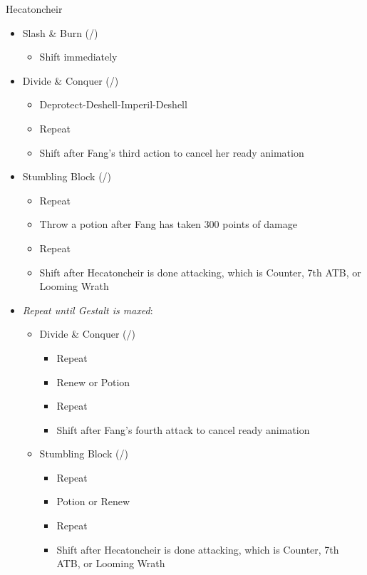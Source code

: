 \renewcommand{\first}{[1] Slash \& Burn (\rav/\com)}
\renewcommand{\second}{[2] Lifeguard (\med/\sen)}
\renewcommand{\third}{[3] Divide \& Conquer (\sab/\com)}
\renewcommand{\fourth}{[4] Stumbling Block (\sab/\sen)}
\begin{battle}{Hecatoncheir}
\begin{multicols}{2}
\begin{itemize}
    \item \first
    \begin{itemize}
        \item Shift immediately
    \end{itemize}
    \item \third
    \begin{itemize}
        \item Deprotect-Deshell-Imperil-Deshell
        \item Repeat
        \item Shift after Fang's third action to cancel her ready animation
    \end{itemize}
    \item \fourth
    \begin{itemize}
        \item Repeat
        \item Throw a potion after Fang has taken 300 points of damage
        \item Repeat
        \item Shift after Hecatoncheir is done attacking, which is Counter, 7th ATB, or Looming Wrath
    \end{itemize}
    \columnbreak
    \item \textit{Repeat until Gestalt is maxed}:
    \begin{itemize}
        \item \third
        \begin{itemize}
            \item Repeat
            \item Renew or Potion
            \item Repeat
            \item Shift after Fang's fourth attack to cancel ready animation
        \end{itemize}
        \item \fourth
        \begin{itemize}
            \item Repeat
            \item Potion or Renew
            \item Repeat
            \item Shift after Hecatoncheir is done attacking, which is Counter, 7th ATB, or Looming Wrath
        \end{itemize}
    \end{itemize}
\end{itemize}
\end{multicols}
\end{battle}

